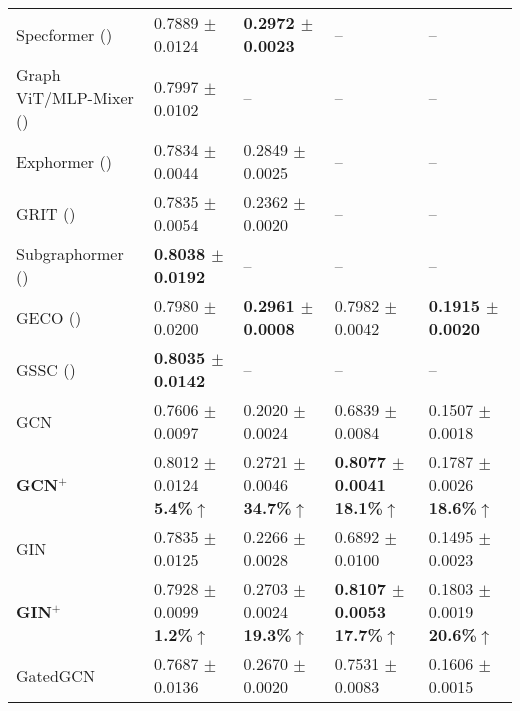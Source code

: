 \begin{table*}[t]
{\begin{tabular}{l|llll}
        Specformer (\citeyear{bo2023specformer}) & 0.7889{\tiny{ $\pm$ 0.0124}} & \textbf{\textcolor{tealblue!90}{0.2972{\tiny{ $\pm$ 0.0023}}}} &  – &  –   \\
        Graph ViT/MLP-Mixer (\citeyear{he2023generalization}) &0.7997{\tiny{ $\pm$ 0.0102}} & – &  – &  –   \\
        Exphormer (\citeyear{shirzad2023exphormer}) &0.7834{\tiny{ $\pm$ 0.0044}}  & 0.2849{\tiny{ $\pm$ 0.0025}} &  – &  –   \\
        GRIT (\citeyear{ma2023graph}) & 0.7835{\tiny{ $\pm$ 0.0054}} &  0.2362{\tiny{ $\pm$ 0.0020}} &  – &  –   \\
         Subgraphormer (\citeyear{bar2024subgraphormer}) & \textbf{\textcolor{tealblue!90}{0.8038{\tiny{ $\pm$ 0.0192}}}} &  – &  –&  –  \\
         GECO (\citeyear{sancak2024scalable})& 0.7980{\tiny{ $\pm$ 0.0200}} &\textbf{\textcolor{darkorange!90}{0.2961{\tiny{ $\pm$ 0.0008}}}} &0.7982{\tiny{ $\pm$ 0.0042}} &\textbf{\textcolor{tealblue!90}{0.1915{\tiny{ $\pm$ 0.0020}}}} \\
         GSSC (\citeyear{huang2024can}) & \textbf{\textcolor{darkorange!90}{0.8035{\tiny{ $\pm$ 0.0142}}}} &  – &  –&  –  \\
        \midrule %
        GCN & 0.7606{\tiny{ $\pm$ 0.0097}} & 0.2020{\tiny{ $\pm$ 0.0024}} & 0.6839{\tiny{ $\pm$ 0.0084}} & 0.1507{\tiny{ $\pm$ 0.0018}}   \\
        \rowcolor{gray!20}
        \textbf{GCN$^+$} & 0.8012{\tiny{ $\pm$ 0.0124}} \textbf{5.4\%$\uparrow$} & 0.2721{\tiny{ $\pm$ 0.0046}} \textbf{34.7\%$\uparrow$} & \textbf{\textcolor{darkorange!90}{0.8077{\tiny{ $\pm$ 0.0041}}}} \textbf{18.1\%$\uparrow$} & 0.1787{\tiny{ $\pm$ 0.0026}} \textbf{18.6\%$\uparrow$} \\  
        \midrule %
        GIN & 0.7835{\tiny{ $\pm$ 0.0125}} & 0.2266{\tiny{ $\pm$ 0.0028}} & 0.6892{\tiny{ $\pm$ 0.0100}} & 0.1495{\tiny{ $\pm$ 0.0023}}   \\  
        \rowcolor{gray!20}
        \textbf{GIN$^+$} & 0.7928{\tiny{ $\pm$ 0.0099}} \textbf{1.2\%$\uparrow$} & 0.2703{\tiny{ $\pm$ 0.0024}} \textbf{19.3\%$\uparrow$} & \textbf{\textcolor{tealblue!90}{0.8107{\tiny{ $\pm$ 0.0053}}}} \textbf{17.7\%$\uparrow$} & 0.1803{\tiny{ $\pm$ 0.0019}} \textbf{20.6\%$\uparrow$} \\  
        \midrule %
        GatedGCN & 0.7687{\tiny{ $\pm$ 0.0136}} & 0.2670{\tiny{ $\pm$ 0.0020}} & 0.7531{\tiny{ $\pm$ 0.0083}} & 0.1606{\tiny{ $\pm$ 0.0015}}   \\  

\end{tabular}}
\end{table*}
